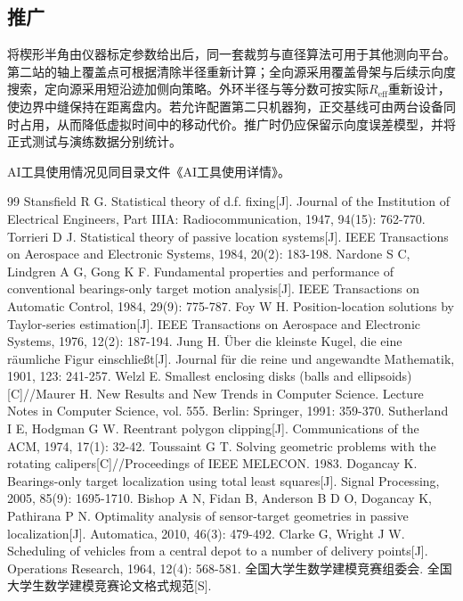 \documentclass{cumcmthesis}
\begin{document}
\subsection{推广}

将楔形半角由仪器标定参数给出后，同一套裁剪与直径算法可用于其他测向平台。第二站的轴上覆盖点可根据清除半径重新计算；全向源采用覆盖骨架与后续示向度搜索，定向源采用短沿迹加侧向策略。外环半径与等分数可按实际$R_{\mathrm{eff}}$重新设计，使边界中缝保持在距离盘内。若允许配置第二只机器狗，正交基线可由两台设备同时占用，从而降低虚拟时间中的移动代价。推广时仍应保留示向度误差模型，并将正式测试与演练数据分别统计。

AI工具使用情况见同目录文件《AI工具使用详情》。

\begin{thebibliography}{99}
 Stansfield R G. Statistical theory of d.f. fixing[J]. Journal of the Institution of Electrical Engineers, Part IIIA: Radiocommunication, 1947, 94(15): 762-770.
 Torrieri D J. Statistical theory of passive location systems[J]. IEEE Transactions on Aerospace and Electronic Systems, 1984, 20(2): 183-198.
 Nardone S C, Lindgren A G, Gong K F. Fundamental properties and performance of conventional bearings-only target motion analysis[J]. IEEE Transactions on Automatic Control, 1984, 29(9): 775-787.
 Foy W H. Position-location solutions by Taylor-series estimation[J]. IEEE Transactions on Aerospace and Electronic Systems, 1976, 12(2): 187-194.
 Jung H. \"{U}ber die kleinste Kugel, die eine r\"{a}umliche Figur einschlie{\ss}t[J]. Journal f\"{u}r die reine und angewandte Mathematik, 1901, 123: 241-257.
 Welzl E. Smallest enclosing disks (balls and ellipsoids)[C]//Maurer H. New Results and New Trends in Computer Science. Lecture Notes in Computer Science, vol. 555. Berlin: Springer, 1991: 359-370.
 Sutherland I E, Hodgman G W. Reentrant polygon clipping[J]. Communications of the ACM, 1974, 17(1): 32-42.
 Toussaint G T. Solving geometric problems with the rotating calipers[C]//Proceedings of IEEE MELECON. 1983.
 Dogancay K. Bearings-only target localization using total least squares[J]. Signal Processing, 2005, 85(9): 1695-1710.
 Bishop A N, Fidan B, Anderson B D O, Dogancay K, Pathirana P N. Optimality analysis of sensor-target geometries in passive localization[J]. Automatica, 2010, 46(3): 479-492.
 Clarke G, Wright J W. Scheduling of vehicles from a central depot to a number of delivery points[J]. Operations Research, 1964, 12(4): 568-581.
 全国大学生数学建模竞赛组委会. 全国大学生数学建模竞赛论文格式规范[S].
\end{thebibliography}
\end{document}

